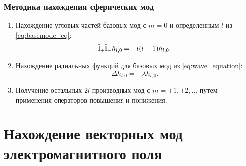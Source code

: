 \documentclass[compress]{beamer}
\begin{document}

    \begin{frame}\frametitle{Методика нахождения сферических мод}

        \begin{enumerate}
            \item Нахождение угловых частей базовых мод с $m = 0$ и определенным $l$ из \autoref{eq:basemode_eq}:
            \begin{equation*}
                \hat{\mathbf{l}}_{+} \hat{\mathbf{l}}_{-} h_{l, 0} = - l (l + 1) h_{l, 0} .
            \end{equation*}

            \item Нахождение радиальных функций для базовых мод из \autoref{eq:wave_equation}:
            \begin{equation*}
                \Delta h_{l, 0} = - \lambda h_{l, 0} .
            \end{equation*}

            \item Получение остальных $2l$ производных мод с $m = \pm 1, \pm 2, \dots$ путем применения операторов повышения и понижения.

        \end{enumerate}

    \end{frame}


    \section[Моды]{Нахождение векторных мод электромагнитного поля}

\end{document}
